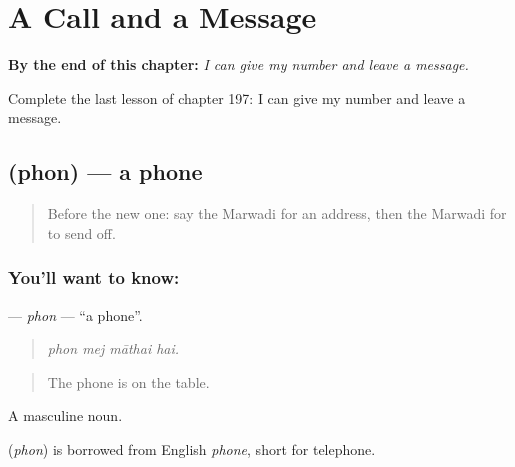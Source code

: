 
\chapter{A Call and a Message}
\label{ch:mw-a-call-and-a-message}

\begin{chapteropening}
\textbf{By the end of this chapter:} \emph{I can give my number and leave a message.}

Complete the last lesson of chapter 197: I can give my number and leave a message.
\end{chapteropening}

\section[\texorpdfstring{\mw{फोन} (phon)}{फोन (phon)}]{ (phon) — a phone}

\label{lesson:MW-C197-phon}



\begin{quote}
Before the new one: say the Marwadi for an address, then the Marwadi for to send off.
\end{quote}

\subsection*{You'll want to know: }
\textbf{} — \emph{phon} — \textquotedblleft{}a phone\textquotedblright{}.

\begin{quote}
   
\end{quote}

\begin{quote}
\emph{phon mej māthai hai.}
\end{quote}

\begin{quote}
The phone is on the table.
\end{quote}

A masculine noun.

\begin{cousinweb}
\textbf{} (\emph{phon}) is borrowed from English \emph{phone}, short for telephone.
\end{cousinweb}

